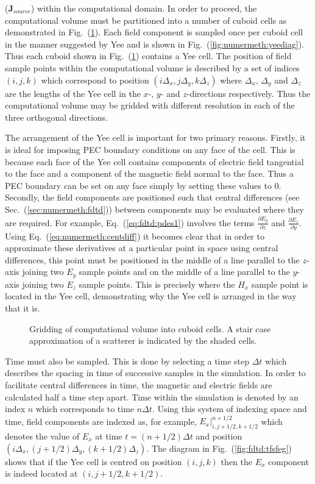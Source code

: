 \documentclass[a4paper, 12pt]{article}
\newcommand{\eq}[1]{Eq.\ (\ref{#1})}
\newcommand{\rfig}[1]{Fig.\ (\ref{#1})}
\newcommand{\sect}[1]{Sec.\ (\ref{#1})}
\begin{document}
	($\mathbf{J}_{source}$) within the
	computational domain. In order
	to proceed, the computational volume must be partitioned into a number
	of cuboid cells as demonstrated in \rfig{fig:fdtd:fdtdgrid}. Each
	field component is sampled once per cuboid cell in the manner
	suggested by Yee \cite{yee66ieeetransantprop302} and is shown in \rfig{fig:numermeth:yeediag}. Thus each cuboid
	shown in \rfig{fig:fdtd:fdtdgrid} contains a Yee cell. The position of field
	sample points within the computational volume is described by a set of
	indices $(i,j,k)$ which correspond to position
	$(i\Delta_x,j\Delta_y,k\Delta_z)$ where $\Delta_x$, $\Delta_y$ and
	$\Delta_z$ are the lengths of the Yee cell in the $x$-, $y$- and $z$-directions respectively. Thus the computational volume may be gridded
	with different resolution in each of the three orthogonal directions.
	
	
	The arrangement of the Yee cell is important for two primary reasons. Firstly, it is ideal for imposing PEC boundary conditions
	on any face of the cell. This is because each face of the Yee cell
	contains components of electric field tangential to the face and a
	component of the magnetic field normal to the face. Thus a PEC
	boundary can be set on any face simply by setting these values to 0. Secondly, the
	field components are positioned such that central differences (see
	\sect{sec:numermeth:fdtd}) between
	components may be evaluated where they are required. For example,
	\eq{eq:fdtd:pdes1} involves the terms $\frac{\partial E_y}{\partial
		z}$ and $\frac{\partial E_z}{\partial y}$. Using
	\eq{eq:numermeth:centdiff} it becomes clear that in order to
	approximate these derivatives at a particular point in space using
	central differences, this
	point must be positioned in the middle of a line parallel to the
	$z$-axis joining two $E_y$ sample points and on the middle of a line
	parallel to the $y$-axis joining two $E_z$ sample points. This is
	precisely where the $H_x$ sample point is located in the Yee cell,
	demonstrating why the Yee cell is arranged in the way that it is.
	\begin{figure}[!h]
		\centering
		\caption{Gridding of computational volume into cuboid cells. A stair
			case approximation of a scatterer is indicated by the shaded cells.}
		\label{fig:fdtd:fdtdgrid}
	\end{figure}
	
	Time must also be sampled. This is done by selecting a time step
	$\Delta t$ which describes the spacing in time of successive samples in
	the simulation. In order to facilitate central differences in time,
	the magnetic and electric fields are calculated half a time step
	apart. Time within the simulation is denoted by an index $n$ which
	corresponds to time $n\Delta t$. Using this system of indexing space
	and time, field components are indexed as, for example,
	$E_x|^{n+1/2}_{i,j+1/2,k+1/2}$ which denotes the value of $E_x$ at
	time $t=(n+1/2)\Delta t$ and position $(i\Delta_x,(j+1/2)\Delta_y,
	(k+1/2)\Delta_z)$. The diagram in \rfig{fig:fdtd:tfsfeg} shows that
	if the Yee cell is centred on position $(i,j,k)$ then the $E_x$
	component is indeed located at $(i,j+1/2,k+1/2)$.
	
\end{document}
